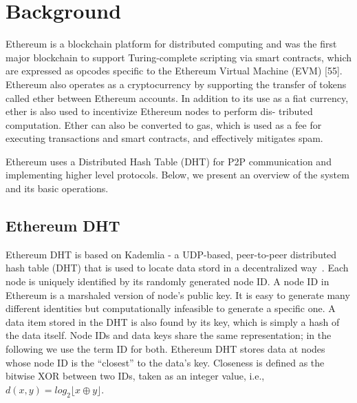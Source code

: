 
\section{Background}
\label{sec:background}


Ethereum is a blockchain platform for distributed computing and was the first major blockchain to support Turing-complete scripting via smart contracts, which are expressed as opcodes specific to the Ethereum Virtual Machine (EVM) [55]. Ethereum also operates as a cryptocurrency by supporting the transfer of tokens called ether between Ethereum accounts. In addition to its use as a fiat currency, ether is also used to incentivize Ethereum nodes to perform dis- tributed computation. Ether can also be converted to gas, which is used as a fee for executing transactions and smart contracts, and effectively mitigates spam. 


Ethereum uses a Distributed Hash Table (DHT) for P2P communication and implementing higher level protocols. Below, we present an overview of the system and its basic operations. 

\subsection{Ethereum DHT}
Ethereum DHT is based on Kademlia - a UDP-based, peer-to-peer distributed hash table (DHT) that is used to locate data stord in a decentralized way~\cite{maymounkov2002kademlia}. Each node is uniquely identified by its randomly generated node ID. A node ID in Ethereum is a marshaled version of node's public key. It is easy to generate many different identities but computationally infeasible to generate a specific one. A data item stored in the DHT is also found by its key, which is simply a hash of the data itself. Node IDs and data keys share the same representation; in the following we use the term ID for both.
Ethereum DHT stores data at nodes whose node ID is the “closest” to the data’s key. Closeness is defined as the bitwise XOR between two IDs, taken as an integer value, i.e.,$d(x, y) = \textit{log}_2 \lfloor x \oplus y \rfloor$.


